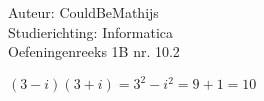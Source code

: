 \documentclass[a4paper]{article}
\begin{document}
  
\noindent \large Auteur: CouldBeMathijs \\
\noindent \large Studierichting: Informatica\\
\noindent \large Oefeningenreeks 1B nr. 10.2\\

\medskip

\normalsize

$(3-i)(3+i) = 3^2 - i^2 = 9 + 1 = 10$

\begin{thebibliography}{999}
\end{thebibliography}
\end{document}
